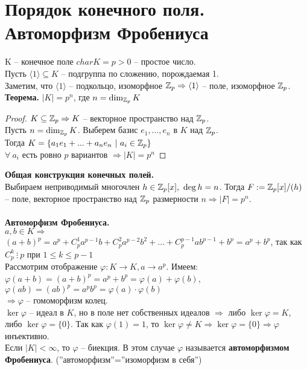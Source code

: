\section{Порядок конечного поля. Автоморфизм Фробениуса}

K -- конечное поле $char{K}=p>0$ -- простое число.\\
Пусть $\langle 1\rangle \subseteq K$ -- подгруппа по сложению, порождаемая 1.\\
Заметим, что $\langle 1\rangle$ -- подкольцо, изоморфное $\mathbb{Z}_p\Rightarrow \langle 1\rangle$ -- поле, изоморфное $\mathbb{Z}_p$.\\
\textbf{Теорема.} $|K|=p^n$, где $n=\dim_{\mathbb{Z}_p}K$
\begin{proof}
    $K\subseteq \mathbb{Z}_p\Rightarrow K$ -- векторное пространство над $\mathbb{Z}_p$.\\
    Пусть $n=\dim_{\mathbb{Z}_p}K$. Выберем базис $e_1,...,e_n$ в $K$ над $\mathbb{Z}_p$.\\
    Тогда $K=\{ a_1e_1+...+a_ne_n \ | \ a_i\in \mathbb{Z}_p\}$\\
    $\forall \ a_i$ есть ровно $p$ вариантов $\Rightarrow |K|=p^n$
\end{proof}
\noindent \textbf{Общая конструкция конечных полей.}\\
Выбираем неприводимый многочлен $h\in \mathbb{Z}_p[x], \ \deg{h}=n$. Тогда $F:=\mathbb{Z}_p[x]/(h)$ -- поле, векторное пространство над $\mathbb{Z}_p$ размерности $n\Rightarrow |F|=p^n$.\\\\
\textbf{Автоморфизм Фробениуса.}\\
$a,b\in K\Rightarrow $\\
$(a+b)^p=a^p+C_p^1a^{p-1}b+C_p^2a^{p-2}b^2+...+C_p^{p-1}ab^{p-1}+b^p=a^p+b^p$, так как $C_p^k\ \vdots\ p$ при $1\leqslant k\leqslant p-1$\\
Рассмотрим отображение $\varphi: K\to K, a\to a^p$. Имеем:\\
$\varphi(a+b)=(a+b)^p=a^p+b^p=\varphi(a)+\varphi(b)$,\\
$\varphi(ab)=(ab)^p=a^pb^p=\varphi(a)\cdot\varphi(b)$\\
$\Rightarrow \varphi$ -- гомоморфизм колец.\\
$\ker\varphi$ -- идеал в $K$, но в поле нет собственных идеалов $\Rightarrow $ либо $\ker\varphi=K$, либо $\ker\varphi=\{0\}$. Так как $\varphi(1)=1$, то $\ker\varphi\neq K\Rightarrow \ker\varphi=\{0\}\Rightarrow\varphi$ инъективно.\\
Если $|K|<\infty$, то $\varphi$ -- биекция. В этом случае $\varphi$ называется \textbf{автоморфизмом Фробениуса}. (''автоморфизм''=''изоморфизм в себя'')